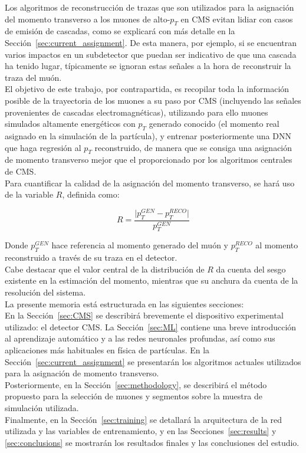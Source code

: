 Los algoritmos de reconstrucci\'on de trazas que son utilizados para la asignaci\'on del momento transverso a los muones de alto-$p_{T}$ en CMS evitan lidiar con casos de emisi\'on de cascadas, como se explicar\'a con m\'as detalle en la Secci\'on~\ref{sec:current_assignment}. De esta manera, por ejemplo, si se encuentran varios impactos en un subdetector que puedan ser indicativo de que una cascada ha tenido lugar, t\'ipicamente se ignoran estas se\~nales a la hora de reconstruir la traza del mu\'on. \\

El objetivo de este trabajo, por contrapartida, es recopilar toda la informaci\'on posible de la trayectoria de los muones a su paso por CMS (incluyendo las se\~nales provenientes de cascadas electromagn\'eticas), utilizando para ello muones simulados altamente energ\'eticos con $p_{T}$ generado conocido (el momento real asignado en la simulaci\'on de la partícula), y entrenar posteriormente una DNN que haga regresi\'on al $p_{T}$ reconstruido, de manera que se consiga una asignaci\'on de momento transverso mejor que el proporcionado por los algoritmos centrales de CMS.\\

Para cuantificar la calidad de la asignaci\'on del momento transverso, se har\'a uso de la variable $R$, definida como:

\begin{equation}
  R = \dfrac{\lvert p_{T}^{GEN} - p_{T}^{RECO}\rvert}{p_{T}^{GEN}}
\label{eq:R}
\end{equation}

Donde $p_{T}^{GEN}$ hace referencia al momento generado del mu\'on y $p_{T}^{RECO}$ al momento reconstruido a trav\'es de su traza en el detector. \\
Cabe destacar que el valor central de la distribuci\'on de $R$ da cuenta del sesgo existente en la estimaci\'on del momento, mientras que su anchura da cuenta de la resoluci\'on del sistema.\\

La presente memoria est\'a estructurada en las siguientes secciones: \\
En la Secci\'on~\ref{sec:CMS} se describir\'a brevemente el dispositivo experimental utilizado: el detector CMS. La Secci\'on~\ref{sec:ML} contiene una breve introducci\'on al aprendizaje autom\'atico y a las redes neuronales profundas, as\'i como sus aplicaciones m\'as habituales en f\'isica de part\'iculas. En la Secci\'on~\ref{sec:current_assignment} se presentar\'an los algoritmos actuales utilizados para la asignaci\'on de momento transverso. \\ Posteriormente, en la Secci\'on~\ref{sec:methodology}, se describir\'a el m\'etodo propuesto para la selecci\'on de muones y segmentos sobre la muestra de simulaci\'on utilizada. \\
Finalmente, en la Secci\'on~\ref{sec:training} se detallar\'a la arquitectura de la red utilizada y las variables de entrenamiento, y en las Secciones~\ref{sec:results} y \ref{sec:conclusions} se mostrar\'an los resultados finales y las conclusiones del estudio.
